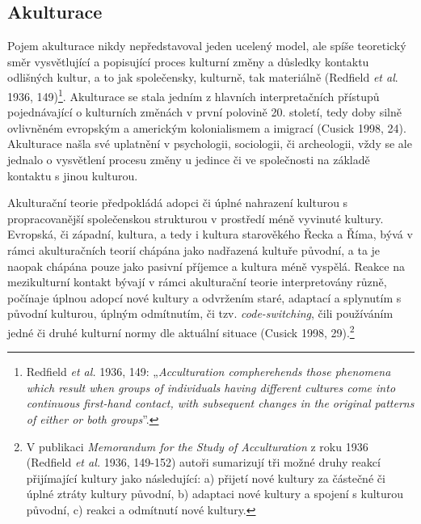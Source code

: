 \subsection[akulturace]{Akulturace}

Pojem akulturace nikdy nepředstavoval jeden ucelený model, ale spíše teoretický směr vysvětlující a popisující proces kulturní změny a důsledky kontaktu odlišných kultur, a to jak společensky, kulturně, tak materiálně (Redfield {\em et al}. 1936, 149)\footnote{Redfield {\em et al.} 1936, 149: „{\em Acculturation compherehends those phenomena which result when groups of individuals having different cultures come into continuous first-hand contact, with subsequent changes in the original patterns of either or both groups}”.}. Akulturace se stala jedním z hlavních interpretačních přístupů pojednávající o kulturních změnách v první polovině 20. století, tedy doby silně ovlivněném evropským a americkým kolonialismem a imigrací (Cusick 1998, 24). Akulturace našla své uplatnění v psychologii, sociologii, či archeologii, vždy se ale jednalo o vysvětlení procesu změny u jedince či ve společnosti na základě kontaktu s jinou kulturou.

Akulturační teorie předpokládá adopci či úplné nahrazení kulturou s propracovanější společenskou strukturou v prostředí méně vyvinuté kultury. Evropská, či západní, kultura, a tedy i kultura starověkého Řecka a Říma, bývá v rámci akulturačních teorií chápána jako nadřazená kultuře původní, a ta je naopak chápána pouze jako pasivní příjemce a kultura méně vyspělá. Reakce na mezikulturní kontakt bývají v rámci akulturační teorie interpretovány různě, počínaje úplnou adopcí nové kultury a odvržením staré, adaptací a splynutím s původní kulturou, úplným odmítnutím, či tzv. {\em code-switching}, čili používáním jedné či druhé kulturní normy dle aktuální situace (Cusick 1998, 29).\footnote{V publikaci {\em Memorandum for the Study of Acculturation} z roku 1936 (Redfield {\em et al.} 1936, 149-152) autoři sumarizují tři možné druhy reakcí přijímající kultury jako následující: a) přijetí nové kultury za částečné či úplné ztráty kultury původní, b) adaptaci nové kultury a spojení s kulturou původní, c) reakci a odmítnutí nové kultury.}

